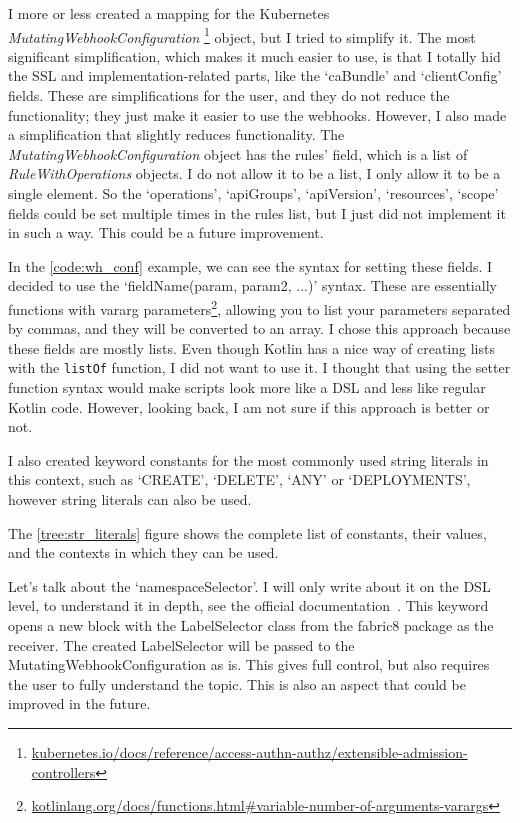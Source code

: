 I more or less created a mapping for the Kubernetes \emph{MutatingWebhookConfiguration}
\footnote{\url{kubernetes.io/docs/reference/access-authn-authz/extensible-admission-controllers}}
object, but I tried to simplify it. The most significant simplification, which makes it much easier to use, is that I totally hid the SSL and implementation-related parts, like the `caBundle' and `clientConfig' fields. These are simplifications for the user, and they do not reduce the functionality; they just make it easier to use the webhooks. However, I also made a simplification that slightly reduces functionality. The \emph{MutatingWebhookConfiguration} object has the rules' field, which is a list of \emph{RuleWithOperations} objects. I do not allow it to be a list, I only allow it to be a single element. So the `operations', `apiGroups', `apiVersion', `resources', `scope' fields could be set multiple times in the rules list, but I just did not implement it in such a way. This could be a future improvement.

In the \ref{code:wh_conf} example, we can see the syntax for setting these fields. I decided to use the `fieldName(param, param2, ...)' syntax. These are essentially functions with vararg parameters\footnote{\url{kotlinlang.org/docs/functions.html\#variable-number-of-arguments-varargs}}, allowing you to list your parameters separated by commas, and they will be converted to an array. I chose this approach because these fields are mostly lists. Even though Kotlin has a nice way of creating lists with the \lstinline|listOf| function, I did not want to use it. I thought that using the setter function syntax would make scripts look more like a DSL and less like regular Kotlin code. However, looking back, I am not sure if this approach is better or not.

I also created keyword constants for the most commonly used string literals in this context, such as `CREATE', `DELETE', `ANY' or `DEPLOYMENTS', however string literals can also be used.

The \ref{tree:str_literals} figure shows the complete list of constants, their values, and the contexts in which they can be used.



Let's talk about the `namespaceSelector'. I will only write about it on the DSL level, to understand it in depth, see the official documentation~\cite{K8sExtensibleNSS}. This keyword opens a new block with the LabelSelector class from the fabric8 package as the receiver. The created LabelSelector will be passed to the MutatingWebhookConfiguration as is. This gives full control, but also requires the user to fully understand the topic. This is also an aspect that could be improved in the future.

